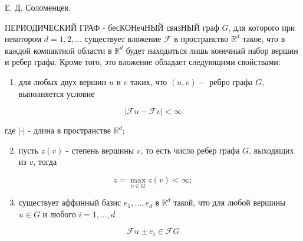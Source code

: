 \documentclass[10pt]{article}
\begin{document}
Е. Д. Соломенцев.



ПЕРИОДИЧЕСКИЙ ГРАФ - бесКОНечНЫЙ связНЫЙ граф $G$, для которого при некотором $d=1,2, \ldots$ существует вложение $\mathscr{F}$ в пространство $\mathbb{R}^{d}$ такое, что в каждой компактной области в $\mathbb{R}^{d}$ будет находиться лишь конечный набор вершин и ребер графа. Кроме того, это вложение обладает следующими свойствами:



\begin{enumerate}

  \item для любых двух вершин $u$ и $v$ таких, что $(u, v)-$ ребро графа $G$, выполняется условие

\end{enumerate}



\[

|\mathscr{F} u-\mathscr{F} v|<\infty

\]



где $|\cdot|$ - длина в пространстве $\mathbb{R}^{d}$;



\begin{enumerate}

  \setcounter{enumi}{1}

  \item пусть $z(v)$ - степень вершины $v$, то есть число ребер графа $G$, выходящих из $v$, тогда

\end{enumerate}



\[

z=\max _{v \in G} z(v)<\infty ;

\]



\begin{enumerate}

  \setcounter{enumi}{2}

  \item существует аффинный базис $e_{1}, \ldots, e_{d}$ в $\mathbb{R}^{d}$ такой, что для любой вершины $u \in G$ и любого $i=1, \ldots, d$

\end{enumerate}



\[

\mathscr{F} u \pm e_{i} \in \mathscr{F} G

\]
\end{document}

